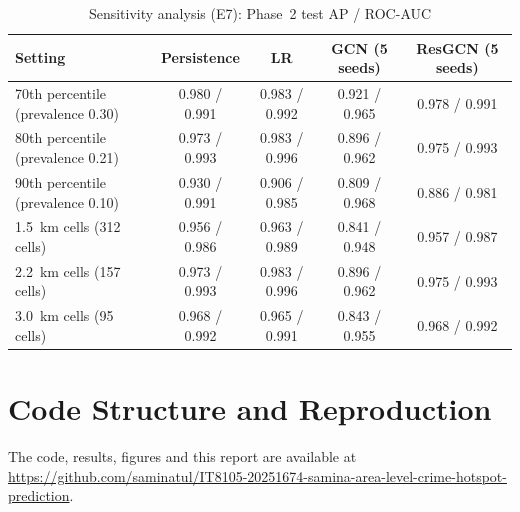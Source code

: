 \documentclass[11pt,a4paper]{report}
\begin{document}
\begin{table}[H]
\centering\small
\caption{Sensitivity analysis (E7): Phase~2 test AP / ROC-AUC}
\label{tab:sens}
\begin{tabular}{@{}lcccc@{}}
\toprule
Setting & Persistence & LR & GCN (5 seeds) & ResGCN (5 seeds)\\
\midrule
70th percentile (prevalence 0.30) & 0.980 / 0.991 & 0.983 / 0.992 & 0.921 / 0.965 & 0.978 / 0.991\\
80th percentile (prevalence 0.21) & 0.973 / 0.993 & 0.983 / 0.996 & 0.896 / 0.962 & 0.975 / 0.993\\
90th percentile (prevalence 0.10) & 0.930 / 0.991 & 0.906 / 0.985 & 0.809 / 0.968 & 0.886 / 0.981\\
1.5~km cells (312 cells) & 0.956 / 0.986 & 0.963 / 0.989 & 0.841 / 0.948 & 0.957 / 0.987\\
2.2~km cells (157 cells) & 0.973 / 0.993 & 0.983 / 0.996 & 0.896 / 0.962 & 0.975 / 0.993\\
3.0~km cells (95 cells) & 0.968 / 0.992 & 0.965 / 0.991 & 0.843 / 0.955 & 0.968 / 0.992\\
\bottomrule
\end{tabular}
\end{table}

\chapter{Code Structure and Reproduction}
\label{app:repro}
The code, results, figures and this report are available at \url{https://github.com/saminatul/IT8105-20251674-samina-area-level-crime-hotspot-prediction}.
\end{document}

